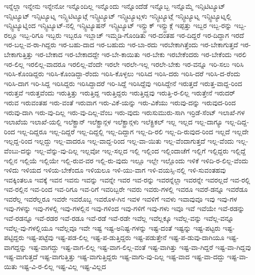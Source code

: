 {ಇನ್ನೆಲ್ಲಾ
ಇನ್ನೇನು
ಇನ್ನೇನೋ
ಇನ್ನೊಂದಿಲ್ಲ
ಇನ್ನೊಂದು
ಇನ್ನೊಂದೆಡೆ
ಇನ್ನೊಬ್ಬ
ಇನ್ನೊಮ್ಮೆ
ಇನ್ಸಿಟಿಟ್ಯೂಟ್
ಇನ್ಸಿಟ್ಯೂಟ್
ಇನ್ಸಿಟ್ಯೂಟ್ನ
ಇನ್ಸ್ಟಿಟಿಟ್ಯೂಟ್ಗೆ
ಇನ್ಸ್ಟಿಟ್ಯೂಟ್
ಇನ್ಸ್ಟಿಟ್ಯೂಟ್ಗಳು
ಇನ್ಸ್ಟಿಟ್ಯೂಟ್ಗೆ
ಇನ್ಸ್ಟಿಟ್ಯೂಟ್ನ
ಇನ್ಸ್ಟಿಟ್ಯೂಟ್ನಲ್ಲಿ
ಇನ್ಸ್ಟಿಟ್ಯೂಟ್ನಿಂದ
ಇನ್ಸ್ಟಿಟ್ಯೂಟ್-ನಲ್ಲಿ
ಇನ್ಸ್ಟಿಟ್ಯೂಷನ್
ಇನ್ಸ್ಟಿಟ್ಯೂಟ್
ಇನ್ಸ್ಬ್ರುಕ್
ಇನ್ಸ್ಬ್ರುಕ್ಗೆ
ಇಪ್ಪತ್ತು
ಇಬ್ಬರ
ಇಬ್ಬ-ರನ್ನು
ಇಬ್ಬ-ರಲ್ಲೂ
ಇಬ್ಬ-ರಿಗೂ
ಇಬ್ಬರು
ಇಬ್ಬರೂ
ಇಬ್ಲಾಚ್
ಇಮ್ಮಡಿ-ಗೊಂಡಿತು
ಇರ-ದಂತಹ
ಇರ-ದಿದ್ದರೆ
ಇರ-ದಿದ್ದಾಗ
ಇರದೆ
ಇರ-ಬಲ್ಲ-ವ-ರಾ-ಗಿದ್ದರು
ಇರ-ಬಹು-ದಾದ
ಇರ-ಬಹುದು
ಇರ-ಬಾ-ರದು
ಇರಬೇಕಾಗಿತ್ತೆಂದು
ಇರ-ಬೇಕಾಗುತ್ತದೆ
ಇರ-ಬೇಕಾಗುತ್ತಿತ್ತು
ಇರ-ಬೇಕಾದ
ಇರ-ಬೇಕಾದದ್ದೇ
ಇರ-ಬೇ-ಕಾಯಿತು
ಇರ-ಬೇಕು
ಇರಬೇಕೆಂದರು
ಇರ-ಬೇಕೆಂದು
ಇರಲಿ
ಇರ-ಲಿಲ್ಲ
ಇರಲಿಲ್ಲ-ವಾದರೂ
ಇರಲಿಲ್ಲ-ವೆಂದೇ
ಇರಲೇ
ಇರಲೇ-ಇಲ್ಲ
ಇರಲೇ-ಬೇಕು
ಇರ-ವನ್ನೂ
ಇರಿ-ಸಲು
ಇರಿಸಿ
ಇರಿಸಿ-ಕೊಂಡಿದ್ದರು
ಇರಿಸಿ-ಕೊಂಡಿದ್ದಾ-ರೆಂದು
ಇರಿಸಿ-ಕೊಳ್ಳಲು
ಇರಿಸಿದ
ಇರಿಸಿ-ದರು
ಇರಿಸಿ-ದರೆ
ಇರಿಸಿ-ದ-ರೆಂದು
ಇರಿಸಿ-ದಾಗ
ಇರಿ-ಸಿದ್ದ
ಇರಿಸಿದ್ದರು
ಇರಿಸಿದ್ದಾದರೆ
ಇರಿ-ಸಿದ್ದೆ
ಇರಿಸಿದ್ದೆವು
ಇರಿಸಿದ್ದೇನೆ
ಇರುತ್ತದೆ
ಇರುತ್ತ-ವಾದ್ದ-ರಿಂದ
ಇರುತ್ತವೆ
ಇರುತ್ತವೆಂದು
ಇರುತ್ತಿತ್ತು
ಇರುತ್ತಿದ್ದ
ಇರುತ್ತಿದ್ದರು
ಇರುತ್ತಿದ್ದವು
ಇರುತ್ತಿ-ರ-ಲಿಲ್ಲ
ಇರುತ್ತೇನೆ
ಇರುದರ್
ಇರುವ
ಇರುವಂತಹ
ಇರು-ವಂತೆ
ಇರುವಾಗ
ಇರು-ವಿಕೆ-ಯನ್ನು
ಇರು-ವಿಕೆಯು
ಇರುವು-ದನ್ನು
ಇರುವುದ-ರಿಂದ
ಇರುವು-ದಾಗಿ
ಇರು-ವು-ದಿಲ್ಲ
ಇರು-ವು-ದಿಲ್ಲ-ವೆಂಬ
ಇರು-ವುದು
ಇರುಸುಮುರು-ಸಾಗಿ
ಇರ್ರಿಡೆ-ಸೆಂಟ್
ಇಲಾಖೆ-ಗಳ
ಇಲಾಖೆಯ
ಇಲಾಖೆ-ಯಲ್ಲಿ
ಇಲೆಕ್ಟ್ರಾನ್
ಇಲೆಕ್ಟ್ರಾನ್ಗಳ
ಇಲೆಕ್ಟ್ರಾನ್ಗಳು
ಇಲೆಕ್ಟ್ರಿಕಲ್
ಇಲ್ಲ
ಇಲ್ಲದ
ಇಲ್ಲ-ದಾಗ್ಯೂ
ಇಲ್ಲ-ದಿದ್ದ-ರಿಂದ
ಇಲ್ಲ-ದಿದ್ದರೂ
ಇಲ್ಲ-ದಿದ್ದರೆ
ಇಲ್ಲ-ದಿದ್ದಲ್ಲಿ
ಇಲ್ಲ-ದಿದ್ದಾಗ
ಇಲ್ಲ-ದಿ-ರಲಿ
ಇಲ್ಲ-ದಿ-ರುವುದ-ರಿಂದ
ಇಲ್ಲದೆ
ಇಲ್ಲದೇ
ಇಲ್ಲದ್ದ-ರಿಂದ
ಇಲ್ಲದ್ದು
ಇಲ್ಲ-ವಾದರೂ
ಇಲ್ಲ-ವಾದ್ದ-ರಿಂದ
ಇಲ್ಲ-ವಾ-ಯಿತು
ಇಲ್ಲ-ವೆಂದಾಗುತ್ತದೆ
ಇಲ್ಲ-ವೆಂದು
ಇಲ್ಲ-ವೆಂಬು-ದನ್ನು
ಇಲ್ಲ-ವೆನ್ನು-ವು-ದಿಲ್ಲ
ಇಲ್ಲವೋ
ಇಲ್ಲ-ಸಲ್ಲದ
ಇಲ್ಲಿ
ಇಲ್ಲಿಂದ
ಇಲ್ಲಿಂದಾಚೆಗೆ
ಇಲ್ಲಿಗೆ
ಇಲ್ಲಿದ್ದರು
ಇಲ್ಲಿದ್ದೆ
ಇಲ್ಲಿನ
ಇಲ್ಲಿಯೆ
ಇಲ್ಲಿಯೇ
ಇಲ್ಲಿ-ರುವ-ವರ
ಇಲ್ಲಿ-ರು-ವುದು
ಇಲ್ಲೂ
ಇಲ್ಲೇ
ಇಲ್ಲೊಂದು
ಇಳಿಕೆ
ಇಳಿದಿ-ರ-ಲಿಲ್ಲ-ವೆಂದು
ಇಳಿದು
ಇಳಿಯದ
ಇಳಿಯ-ಬೇಕೆಂದೂ
ಇಳಿಯಲೂ
ಇಳಿ-ಯು-ವಾಗ
ಇಳಿ-ವಯಸ್ಸಿ-ನಲ್ಲಿ
ಇಳಿ-ಸುವಂತಹವು
ಇವಕ್ಕಿಂತಲೂ
ಇವಕ್ಕೆ
ಇವನ
ಇವನು
ಇವನ್ನು
ಇವನ್ನೇ
ಇವರ
ಇವ-ರನ್ನು
ಇವರನ್ನೆಲ್ಲಾ
ಇವರನ್ನೇ
ಇವರಲ್ಲದೆ
ಇವ-ರಲ್ಲಿ
ಇವ-ರಲ್ಲಿನ
ಇವ-ರಿಂದ
ಇವ-ರಿಗೂ
ಇವ-ರಿಗೆ
ಇವರಿಬ್ಬರೇ
ಇವರು
ಇವರು-ಗಳಲ್ಲಿ
ಇವರೂ
ಇವರೆ-ಡನ್ನೂ
ಇವರೆಡೂ
ಇವರೆಲ್ಲ
ಇವರೆಲ್ಲರೂ
ಇವರೇ
ಇವರೊಬ್ಬ
ಇವರೊಳ-ಗಿನ
ಇವಳ
ಇವಳಿಗೆ
ಇವಳು
ಇವಾವುವೂ
ಇವು
ಇವು-ಗಳ
ಇವು-ಗಳನ್ನು
ಇವು-ಗಳಲ್ಲಿ
ಇವು-ಗಳಲ್ಲಿನ
ಇವು-ಗಳಿಂದ
ಇವು-ಗಳಿಗೆ
ಇವು-ಗಳು
ಇವೂ
ಇವೆ
ಇವೆಯೇ
ಇವೆ-ರಡನ್ನು
ಇವೆ-ರಡನ್ನೂ
ಇವೆ-ರಡರ
ಇವೆ-ರಡೂ
ಇವೆ-ರಡೆ
ಇವೆ-ರಡೇ
ಇವೆಲ್ಲ
ಇವೆಲ್ಲಕ್ಕೂ
ಇವೆಲ್ಲ-ವನ್ನು
ಇವೆಲ್ಲ-ವನ್ನೂ
ಇವೆಲ್ಲ-ವು-ಗಳಲ್ಲಿಯೂ
ಇವೆಲ್ಲವೂ
ಇವೇ
ಇಷ್ಟ
ಇಷ್ಟ-ಅನಿಷ್ಟ-ಗಳನ್ನು
ಇಷ್ಟ-ದಂತೆ
ಇಷ್ಟನ್ನು
ಇಷ್ಟ-ಪಟ್ಟರು
ಇಷ್ಟ-ಪಟ್ಟಿದ್ದರು
ಇಷ್ಟ-ಪಟ್ಟೆವು
ಇಷ್ಟ-ಪಡ-ಲಿಲ್ಲ
ಇಷ್ಟ-ಪ-ಡುತ್ತಿದ್ದರು
ಇಷ್ಟ-ಪಡುತ್ತೇನೆ
ಇಷ್ಟ-ಪ-ಡುವು-ದಾಗಿಯೂ
ಇಷ್ಟ-ವಾಗದ್ದನ್ನು
ಇಷ್ಟ-ವಾಗದ್ದು
ಇಷ್ಟ-ವಾಗ-ಲಿಲ್ಲ
ಇಷ್ಟ-ವಾಗ-ಲಿಲ್ಲ-ವಂತೆ
ಇಷ್ಟ-ವಾಗಿತ್ತು
ಇಷ್ಟ-ವಾ-ಗಿದ್ದರೆ
ಇಷ್ಟ-ವಾ-ಗಿದ್ದವು
ಇಷ್ಟ-ವಾಗುತ್ತದೆ
ಇಷ್ಟ-ವಾಗುತ್ತಿತ್ತು
ಇಷ್ಟ-ವಾಗುತ್ತಿದ್ದರು
ಇಷ್ಟ-ವಾಗು-ವು-ದಿಲ್ಲ
ಇಷ್ಟ-ವಾದ
ಇಷ್ಟ-ವಾ-ದದ್ದು
ಇಷ್ಟ-ವಾ-ಯಿತು
ಇಷ್ಟ-ವಿ-ರ-ಲಿಲ್ಲ
ಇಷ್ಟ-ವಿಲ್ಲ
ಇಷ್ಟ-ವಿಲ್ಲದ
}
